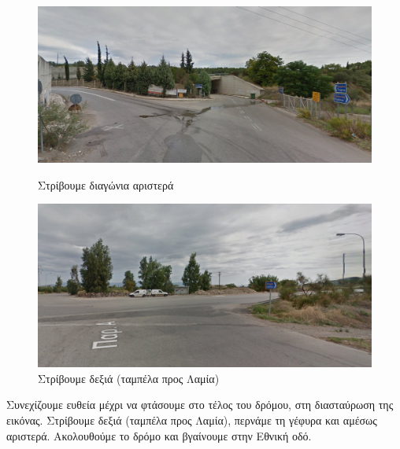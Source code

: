 \begin{figure}[hbp!]
		\includegraphics[width=\textwidth]{images/athina-lamia/tragana/tragana5.PNG}
			\caption{Στρίβουμε διαγώνια αριστερά}

		\includegraphics[width=\textwidth]{images/athina-lamia/tragana/tragana6.PNG}
			\caption{Στρίβουμε δεξιά (ταμπέλα προς Λαμία)}
\end{figure}			

Συνεχίζουμε ευθεία μέχρι να φτάσουμε στο τέλος του δρόμου, στη διασταύρωση της εικόνας. Στρίβουμε δεξιά (ταμπέλα προς Λαμία), περνάμε τη γέφυρα και αμέσως αριστερά. Ακολουθούμε το δρόμο και βγαίνουμε στην Εθνική οδό.

